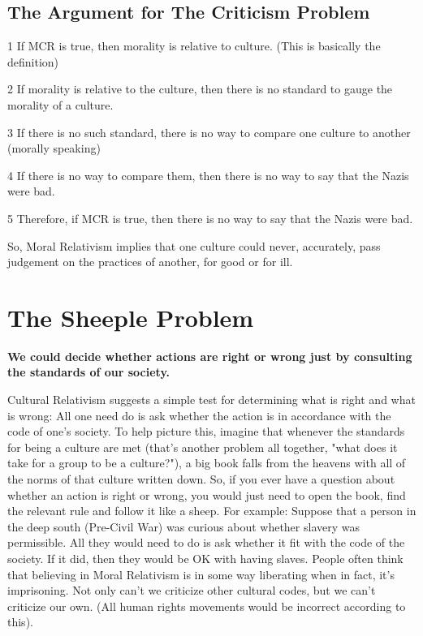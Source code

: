 \subsection{The Argument for The Criticism Problem}

\begin{earg}
    \item[1] If MCR is true, then morality is relative to culture. (This is basically the definition)
    \item[2] If morality is relative to the culture, then there is no standard to gauge the morality of a culture.
    \item[3] If there is no such standard, there is no way to compare one culture to another (morally speaking)
    \item[4] If there is no way to compare them, then there is no way to say that the Nazis were bad.
    \item[5] Therefore, if MCR is true, then there is no way to say that the Nazis were bad.
\end{earg}

So, Moral Relativism implies that one culture could never, accurately, pass judgement on the practices of another, for good or for ill.

\section{The Sheeple Problem}

\begin{center}
\textbf{We could decide whether actions are right or wrong just by consulting the standards of our society.}
\end{center}

Cultural Relativism suggests a simple test for determining what is right and what is wrong: All one need do is ask whether the action is in accordance with the code of one's society. To help picture this, imagine that whenever the standards for being a culture are met (that's another problem all together, "what does it take for a group to be a culture?"), a big book falls from the heavens with all of the norms of that culture written down. So, if you ever have a question about whether an action is right or wrong, you would just need to open the book, find the relevant rule and follow it like a sheep.  For example:  Suppose that a person in the deep south (Pre-Civil War) was curious about whether slavery was permissible. All they would need to do is ask whether it fit with the code of the society. If it did, then they would be OK with having slaves. People often think that believing in Moral Relativism is in some way liberating when in fact, it's imprisoning.  Not only can’t we criticize other cultural codes, but we can’t criticize our own. (All human rights movements would be incorrect according to this).

